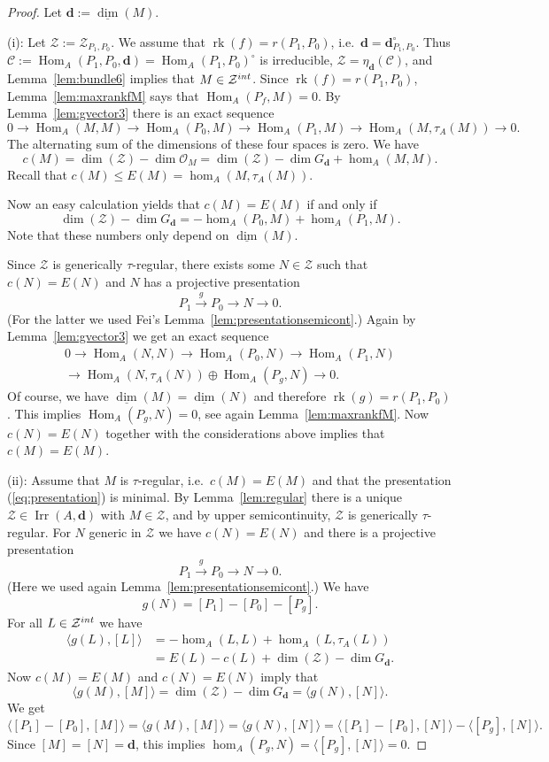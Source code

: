 \documentclass[10pt,a4paper]{amsart}
\newcommand{\Hom}{\operatorname{Hom}}
\newcommand{\bd}{\mathbf{d}}
\newcommand{\bil}[1]{\langle #1\rangle}
\newcommand{\cC}{{\mathcal C}}
\newcommand{\cO}{{\mathcal O}}
\newcommand{\calZ}{\mathcal{Z}}
\newcommand{\dimv}{\underline{\dim}}
\newcommand{\irr}{\operatorname{Irr}}
\newcommand{\rk}{\operatorname{rk}}
\begin{document}
\begin{proof}
Let $\bd := \dimv(M)$.

(i):
Let $\calZ := \calZ_{P_1,P_0}$.
We assume that $\rk(f) = r(P_1,P_0)$,
i.e.\ $\bd = \bd_{P_1,P_0}^\circ$.
Thus $\cC := \Hom_A(P_1,P_0,\bd) = \Hom_A(P_1,P_0)^\circ$ is irreducible,
$\calZ = \eta_\bd(\cC)$,
and Lemma~\ref{lem:bundle6} implies that
$M \in \calZ^{\rm int}$.
Since $\rk(f) = r(P_1,P_0)$, Lemma~\ref{lem:maxrankfM}
says that $\Hom_A(P_f,M) = 0$.
By Lemma~\ref{lem:gvector3}
there is an exact sequence
$$
0 \to \Hom_A(M,M) \to \Hom_A(P_0,M) \to \Hom_A(P_1,M)
\to \Hom_A(M,\tau_A(M)) \to 0.
$$
The alternating sum of the dimensions of these
four spaces is zero.
We have
$$
c(M) = \dim(\calZ) - \dim \cO_M = \dim(\calZ) - \dim G_\bd + \hom_A(M,M).
$$
Recall that $c(M) \le E(M) = \hom_A(M,\tau_A(M))$.

Now an easy calculation yields that
$c(M) = E(M)$ if and only if
$$
\dim(\calZ) - \dim G_\bd = -\hom_A(P_0,M) + \hom_A(P_1,M).
$$
Note that
these numbers only depend on $\dimv(M)$.

Since $\calZ$ is generically $\tau$-regular, there exists some
$N \in \calZ$ such that $c(N) = E(N)$ and $N$ has
a projective presentation
$$
P_1 \xrightarrow{g} P_0 \to N \to 0.
$$
(For the latter we used Fei's Lemma~\ref{lem:presentationsemicont}.)
Again by Lemma~\ref{lem:gvector3}
we get an exact sequence
\begin{multline*}
0 \to \Hom_A(N,N) \to \Hom_A(P_0,N) \to \Hom_A(P_1,N)
\\
\to \Hom_A(N,\tau_A(N)) \oplus \Hom_A(P_g,N) \to 0.
\end{multline*}
Of course, we have $\dimv(M) = \dimv(N)$ and therefore
$\rk(g) = r(P_1,P_0)$.
This implies $\Hom_A(P_g,N) = 0$, see again Lemma~\ref{lem:maxrankfM}.
Now $c(N) = E(N)$ together with the considerations above implies that
$c(M) = E(M)$.


(ii):
Assume that $M$ is $\tau$-regular, i.e.\ $c(M) = E(M)$
and that the presentation (\ref{eq:presentation}) is minimal.
By Lemma~\ref{lem:regular}
there is a unique $\calZ \in \irr(A,\bd)$ with $M \in \calZ$, and by
upper semicontinuity, $\calZ$ is generically $\tau$-regular.
For $N$ generic in $\calZ$ we have $c(N) = E(N)$ and there is a projective presentation
$$
P_1 \xrightarrow{g} P_0 \to N \to 0.
$$
(Here we used again Lemma~\ref{lem:presentationsemicont}.)
We have
$$
g(N) = [P_1] - [P_0] - [P_g].
$$
For all $L \in \calZ^{\rm int}$ we have
\begin{align*}
\bil{g(L),[L]} &= - \hom_A(L,L) + \hom_A(L,\tau_A(L))
\\
&= E(L) - c(L) + \dim(\calZ) - \dim G_\bd.
\end{align*}
Now $c(M) = E(M)$ and $c(N) = E(N)$ imply that
$$
\bil{g(M),[M]} = \dim(\calZ) - \dim G_\bd = \bil{g(N),[N]}.
$$
We get
$$
\bil{[P_1]-[P_0],[M]} = \bil{g(M),[M]} = \bil{g(N),[N]} =
\bil{[P_1]-[P_0],[N]} - \bil{[P_g],[N]}.
$$
Since $[M] = [N] = \bd$, this
implies $\hom_A(P_g,N) = \bil{[P_g],[N]} = 0$.


\end{proof}
\end{document}
